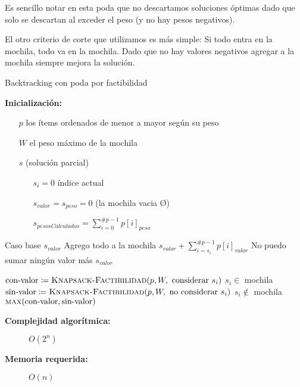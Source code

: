 \documentclass[fleqn, 11pt]{article}
\def\is{\coloneqq}
\begin{document}
Es sencillo notar en esta poda que no descartamos soluciones óptimas dado que
solo se descartan al exceder el peso (y no hay pesos negativos).

El otro criterio de corte que utilizamos es más simple: Si todo entra en la
mochila, todo va en la mochila. Dado que no hay valores negativos agregar a la
mochila siempre mejora la solución.

\clearpage

\begin{algorithm}
\caption{Backtracking con poda por factibilidad}
\begin{algorithmic}[1]
\item[\textbf{Inicialización:}]
\item[] \begin{itemize}
	\item[] $p$ los ítems ordenados de menor a mayor según su peso
	\item[] $W$ el peso máximo de la mochila
	\item[] $s$ (solución parcial)
	\begin{itemize}
		\item[] $s_i = 0$ índice actual
		\item[] $s_{valor} = s_{peso} = 0$ (la mochila vacia \O)
		\item[] $s_{pesosCalculados} = \sum_{i = 0}^{\#p - 1} p[i]_{peso}$
	\end{itemize}
\end{itemize}
\Statex
{}
	\Comment Caso base
	\State \Return $s_{valor}$
\EndIf
{}
	\Comment Agrego todo a la mochila
	\State \Return $s_{valor} + \sum_{i=s_i}^{\#p - 1} p[i]_{valor}$
\EndIf
{}
	\Comment No puedo sumar ningún valor más
	\State \Return $s_{valor}$
\EndIf

\State $\text{con-valor} \is \Call{Knapsack-Factibilidad}{p, W, \text{ considerar } s_i}$
\Comment $s_i \in$ mochila
\State $\text{sin-valor} \is \Call{Knapsack-Factibilidad}{p, W, \text{ no considerar } s_i}$
\Comment $s_i \not\in$ mochila
\State \Return $\Call{max}{\text{con-valor}, \text{sin-valor}}$
\EndFunction
\end{algorithmic}
\begin{description}
	\item[\textbf{Complejidad algorítmica:}] $O(2^n)$
	\item[\textbf{Memoria requerida:}] $O(n)$
\end{description}
\end{algorithm}
\end{document}
